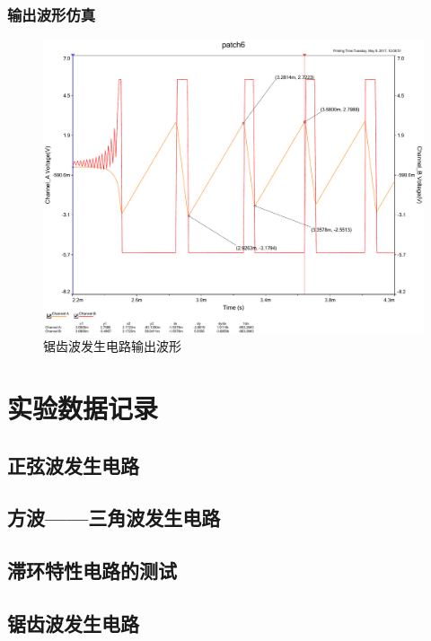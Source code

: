 \documentclass[UTF8,a4paper]{paper}
\begin{document}
\subsubsection{输出波形仿真}
\begin{figure}
\centering
\includegraphics[width=\textwidth]{tan.pdf}
\caption{锯齿波发生电路输出波形}
\label{BI}
\end{figure}
\section{实验数据记录}
\subsection{正弦波发生电路}
\subsection{方波——三角波发生电路}
\subsection{滞环特性电路的测试}
\subsection{锯齿波发生电路}
\end{document}
